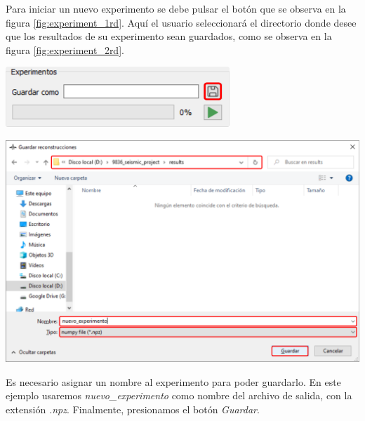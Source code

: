 \documentclass[12pt,twoside,letter]{ol-softwaremanual}
\newenvironment{Figure}
  {\par\medskip\noindent\minipage{\linewidth}}
  {\endminipage\par\medskip}
\begin{document}
\begin{multicols}{2}
	
	Para iniciar un nuevo experimento se debe pulsar el botón \hspace{0.5mm} \faSave \hspace{0.5mm} que se observa en la figura \ref{fig:experiment_1rd}. Aquí el usuario seleccionará el directorio donde desee que los resultados de su experimento sean guardados, como se observa en la figura \ref{fig:experiment_2rd}.
	
	\begin{Figure}
		\vspace{5mm}
		\centering
		\includegraphics[width=0.8\linewidth]{experiment-1.png}
		\label{fig:experiment_1rd}
	\end{Figure}
	
\end{multicols}

\begin{Figure}
	\centering
	\includegraphics[width=1\linewidth]{experiment-2.png}
	\label{fig:experiment_2rd}
\end{Figure}

Es necesario asignar un nombre al experimento para poder guardarlo. En este ejemplo usaremos \emph{nuevo\_experimento} como nombre del archivo de salida, con la extensión \emph{.npz}. Finalmente, presionamos el botón \emph{Guardar}.
\end{document}
